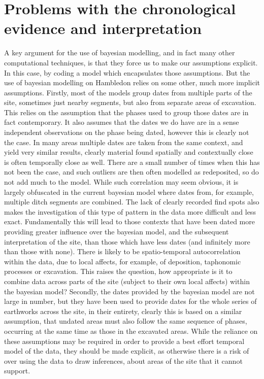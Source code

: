 \section{Problems with the chronological evidence and interpretation}
A key argument for the use of bayesian modelling, and in fact many other computational techniques, is that they force us to make our assumptions explicit. In this case, by coding a model which encapsulates those assumptions. But the use of bayesian modelling on Hambledon relies on some other, much more implicit assumptions. Firstly, most of the models group dates from multiple parts of the site, sometimes just nearby segments, but also from separate areas of excavation. This relies on the assumption that the phases used to group those dates are in fact contemporary. It also assumes that the dates we do have are in a sense independent observations on the phase being dated, however this is clearly not the case. In many areas multiple dates are taken from the same context, and yield very similar results, clearly material found spatially and contextually close is often temporally close as well. There are a small number of times when this has not been the case, and such outliers are then often modelled as redeposited, so do not add much to the model. While such correlation may seem obvious, it is largely obfuscated in the current bayesian model where dates from, for example, multiple ditch segments are combined. The lack of clearly recorded find spots also makes the investigation of this type of pattern in the data more difficult and less exact. Fundamentally this will lead to those contexts that have been dated more providing greater influence over the bayesian model, and the subsequent interpretation of the site, than those which have less dates (and infinitely more than those with none). There is likely to be spatio-temporal autocorrelation within the data, due to local affects, for example, of deposition, taphonomic processes or excavation. This raises the question, how appropriate is it to combine data across parts of the site (subject to their own local affects) within the bayesian model? Secondly, the dates provided by the bayesian model are not large in number, but they have been used to provide dates for the whole series of earthworks across the site, in their entirety, clearly this is based on a similar assumption, that undated areas must also follow the same sequence of phases, occurring at the same time as those in the excavated areas. While the reliance on these assumptions may be required in order to provide a best effort temporal model of the data, they should be made explicit, as otherwise there is a risk of over using the data to draw inferences, about areas of the site that it cannot support.

